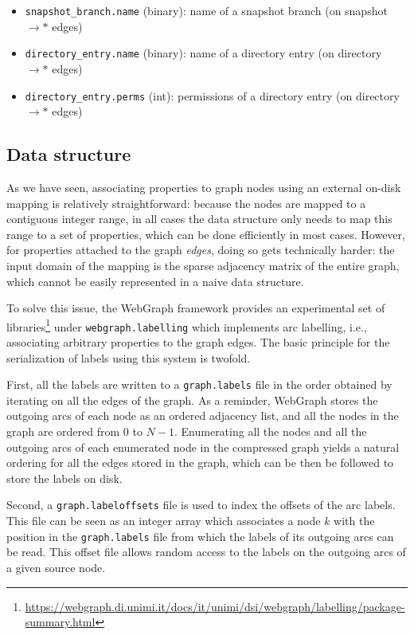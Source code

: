 \begin{itemize}
    \setlength\itemsep{0em}
\item \texttt{snapshot\_branch.name} (binary): name of a snapshot branch
    (on snapshot $\to\ast$ edges)
\item \texttt{directory\_entry.name} (binary): name of a directory entry
    (on directory $\to\ast$ edges)
\item \texttt{directory\_entry.perms} (int): permissions of a directory
    entry (on directory $\to\ast$ edges)
\end{itemize}

\subsection{Data structure}%
\label{sec:label-data-structure}

As we have seen, associating properties to graph nodes using an external
on-disk mapping is relatively straightforward: because the nodes are mapped to
a contiguous integer range, in all cases the data structure only needs to map
this range to a set of properties, which can be done efficiently in most cases.
However, for properties attached to the graph \emph{edges}, doing so gets
technically harder: the input domain of the mapping is the sparse adjacency
matrix of the entire graph, which cannot be easily represented in a naive data
structure.

To solve this issue, the WebGraph framework provides an experimental set of
libraries\footnote{\url{https://webgraph.di.unimi.it/docs/it/unimi/dsi/webgraph/labelling/package-summary.html}}
under \texttt{webgraph.labelling} which implements arc labelling, i.e.,
associating arbitrary properties to the graph edges. The basic principle for
the serialization of labels using this system is twofold.

First, all the labels
are written to a \texttt{graph.labels} file in the order obtained by iterating
on all the edges of the graph.  As a reminder, WebGraph stores the outgoing
arcs of each node as an ordered adjacency list, and all the nodes in the graph
are ordered from $0$ to $N-1$.  Enumerating all the nodes and all the outgoing
arcs of each enumerated node in the compressed graph yields a natural ordering
for all the edges stored in the graph, which can be then be followed to store
the labels on disk.

Second, a \texttt{graph.labeloffsets} file is used to index the offsets of the
arc labels. This file can be seen as an integer array which associates a node
$k$ with the position in the \texttt{graph.labels} file from which the labels
of its outgoing arcs can be read. This offset file allows random access to the
labels on the outgoing arcs of a given source node.


